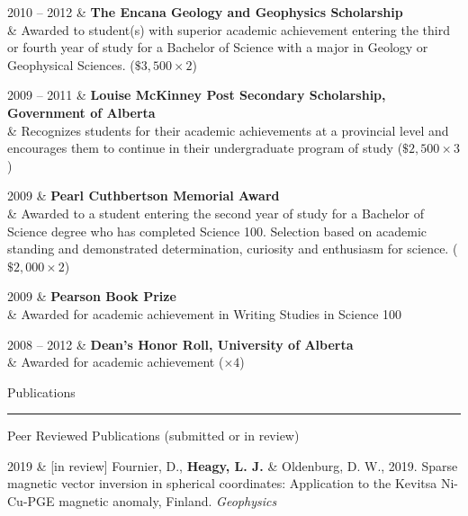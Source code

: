 \documentclass[a4paper, 11pt]{article}
\newcommand{\heading}[1]{
    \begin{minipage}[t]{\textwidth}
    \vspace{0.1cm}
    {\LARGE #1}\\
    \vspace{-0.24cm}
    \hrule
    \end{minipage}
    \vspace{0.05cm}

}
\newcommand{\subheading}[1]{
    \vspace{0.4cm}
    {\Large #1}\\
    \vspace{-0.2cm}
}
\begin{document}
\begin{entryright}
2010 -- 2012 & \textbf{The Encana Geology and Geophysics Scholarship} \\
& Awarded to student(s) with superior academic achievement entering the third or fourth year of study for a Bachelor of Science with a major in Geology or Geophysical Sciences. ($\$3,500 \times 2$)
\end{entryright}

\begin{entryright}
2009 -- 2011 & \textbf{Louise McKinney Post Secondary Scholarship, Government of Alberta} \\
& Recognizes students for their academic achievements at a provincial level and encourages them to continue in their undergraduate program of study ($\$2,500 \times 3$)
\end{entryright}

\begin{entryright}
2009 & \textbf{Pearl Cuthbertson Memorial Award} \\
& Awarded to a student entering the second year of study for a Bachelor of Science degree who has completed Science 100. Selection based on academic standing and demonstrated determination, curiosity and enthusiasm for science. ($\$2,000 \times 2$)
\end{entryright}

\begin{entryright}
2009 & \textbf{Pearson Book Prize}\\
& Awarded for academic achievement in Writing Studies in Science 100
\end{entryright}

\begin{entryright}
2008 -- 2012 & \textbf{Dean's Honor Roll, University of Alberta} \\
& Awarded for academic achievement ($\times 4$)
\end{entryright}

\heading{Publications}
\label{sec:publications}

% 
% 

\subheading{Peer Reviewed Publications (submitted or in review)}

\begin{entryright}
2019 & [in review] Fournier, D., \textbf{Heagy, L. J.} \& Oldenburg, D. W., 2019. Sparse magnetic vector inversion in spherical coordinates: Application to the Kevitsa Ni-Cu-PGE magnetic anomaly, Finland. \emph{Geophysics}
\end{entryright}
\end{document}
